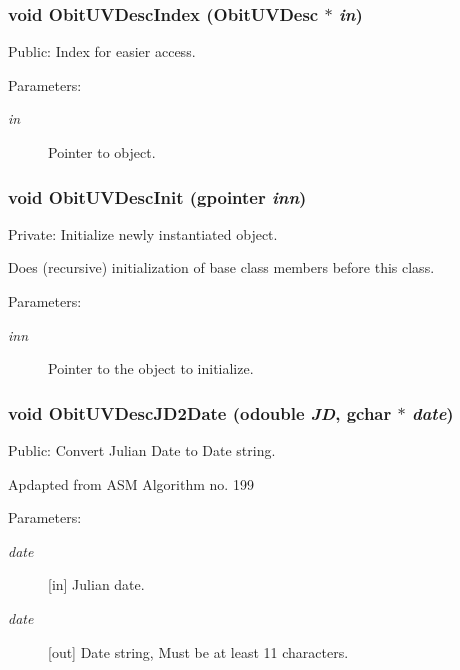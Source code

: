 \subsubsection{\setlength{\rightskip}{0pt plus 5cm}void Obit\-UVDesc\-Index ({\bf Obit\-UVDesc} $\ast$ {\em in})}\label{ObitUVDesc_8c_a14}


Public: Index for easier access. 

\begin{Desc}
\item[Parameters:]
\begin{description}
\item[{\em in}]Pointer to object. \end{description}
\end{Desc}
\subsubsection{\setlength{\rightskip}{0pt plus 5cm}void Obit\-UVDesc\-Init (gpointer {\em inn})}\label{ObitUVDesc_8c_a6}


Private: Initialize newly instantiated object. 

Does (recursive) initialization of base class members before this class. \begin{Desc}
\item[Parameters:]
\begin{description}
\item[{\em inn}]Pointer to the object to initialize. \end{description}
\end{Desc}
\subsubsection{\setlength{\rightskip}{0pt plus 5cm}void Obit\-UVDesc\-JD2Date ({\bf odouble} {\em JD}, gchar $\ast$ {\em date})}\label{ObitUVDesc_8c_a18}


Public: Convert Julian Date to Date string. 

Apdapted from ASM Algorithm no. 199 \begin{Desc}
\item[Parameters:]
\begin{description}
\item[{\em date}][in] Julian date. \item[{\em date}][out] Date string, Must be at least 11 characters. \end{description}
\end{Desc}
